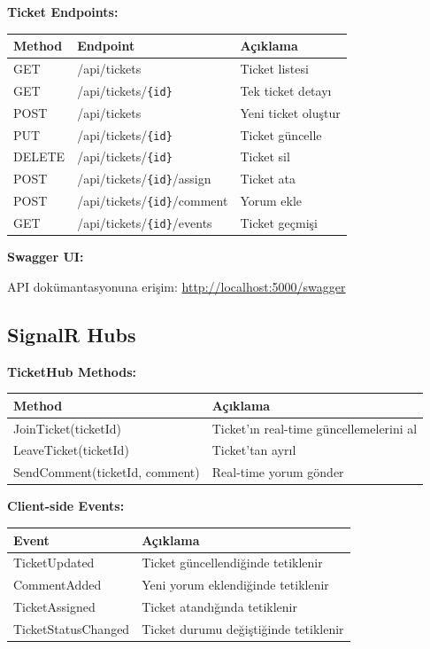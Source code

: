 \documentclass[12pt,a4paper]{article}
\begin{document}
\textbf{Ticket Endpoints:}

\begin{table}[h]
\small
\begin{tabular}{|l|l|p{5cm}|}
\hline
\textbf{Method} & \textbf{Endpoint} & \textbf{Açıklama} \\
\hline
GET & /api/tickets & Ticket listesi \\
GET & /api/tickets/\texttt{\{id\}} & Tek ticket detayı \\
POST & /api/tickets & Yeni ticket oluştur \\
PUT & /api/tickets/\texttt{\{id\}} & Ticket güncelle \\
DELETE & /api/tickets/\texttt{\{id\}} & Ticket sil \\
POST & /api/tickets/\texttt{\{id\}}/assign & Ticket ata \\
POST & /api/tickets/\texttt{\{id\}}/comment & Yorum ekle \\
GET & /api/tickets/\texttt{\{id\}}/events & Ticket geçmişi \\
\hline
\end{tabular}
\end{table}

\textbf{Swagger UI:}

API dokümantasyonuna erişim: \url{http://localhost:5000/swagger}

\subsection{SignalR Hubs}

\textbf{TicketHub Methods:}

\begin{table}[h]
\small
\begin{tabular}{|l|p{8cm}|}
\hline
\textbf{Method} & \textbf{Açıklama} \\
\hline
JoinTicket(ticketId) & Ticket'ın real-time güncellemelerini al \\
LeaveTicket(ticketId) & Ticket'tan ayrıl \\
SendComment(ticketId, comment) & Real-time yorum gönder \\
\hline
\end{tabular}
\end{table}

\textbf{Client-side Events:}

\begin{table}[h]
\small
\begin{tabular}{|l|p{8cm}|}
\hline
\textbf{Event} & \textbf{Açıklama} \\
\hline
TicketUpdated & Ticket güncellendiğinde tetiklenir \\
CommentAdded & Yeni yorum eklendiğinde tetiklenir \\
TicketAssigned & Ticket atandığında tetiklenir \\
TicketStatusChanged & Ticket durumu değiştiğinde tetiklenir \\
\hline
\end{tabular}
\end{table}
\end{document}
